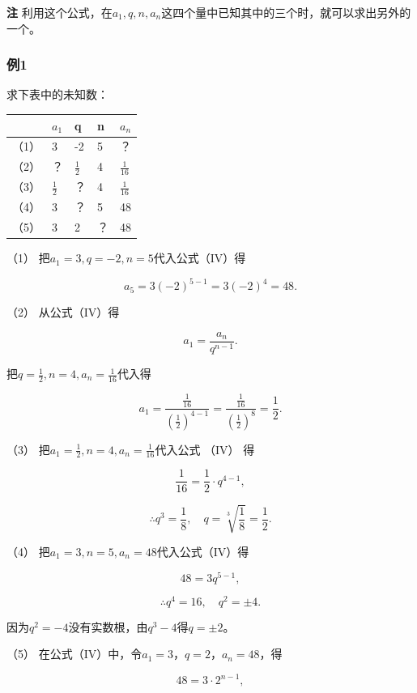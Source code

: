 \textbf{注}
利用这个公式，在\(a_1, q, n, a_n\)这四个量中已知其中的三个时，就可以求出另外的一个。

\subsubsection{例1}

求下表中的未知数：

{\def\LTcaptype{none} %
\begin{longtable}[]{@{}lllll@{}}
\toprule\noalign{}
& \(a_1\) & q & n & \(a_n\) \\
\midrule\noalign{}
\endhead
\bottomrule\noalign{}
\endlastfoot
（1） & 3 & -2 & 5 & ？ \\
（2） & ？ & \(\frac{1}{2}\) & 4 & \(\frac{1}{16}\) \\
（3） & \(\frac{1}{2}\) & ？ & 4 & \(\frac{1}{16}\) \\
（4） & 3 & ？ & 5 & 48 \\
（5） & 3 & 2 & ？ & 48 \\
\end{longtable}
}

 （1） 把\(a_1 = 3, q = -2, n = 5\)代入公式（IV）得

\[
a_{5} = 3 (- 2)^{5 - 1} = 3 (- 2)^{4} = 48.
\]

（2） 从公式（IV）得

\[
a_{1} = \frac{a_{n}}{q^{n - 1}}.
\]

把\(q = \frac{1}{2}, n = 4, a_n = \frac{1}{16}\)代入得

\[
a_{1} = \frac{\frac{1}{16}}{\left(\frac{1}{2}\right)^{4 - 1}} = \frac{\frac{1}{16}}{\left(\frac{1}{2}\right)^{8}} = \frac{1}{2}.
\]

（3） 把\(a_1 = \frac{1}{2}, n = 4, a_n = \frac{1}{16}\)代入公式 （IV）
得

\[
\frac{1}{16} = \frac{1}{2} \cdot q^{4 - 1},
\]

\[
\therefore q^{3} = \frac{1}{8}, \quad q = \sqrt[3]{\frac{1}{8}} = \frac{1}{2}.
\]

（4） 把\(a_1 = 3, n = 5, a_n = 48\)代入公式（IV）得

\[
48 = 3 q^{5 - 1},
\]

\[
\therefore q^{4} = 16, \quad q^{2} = \pm 4.
\]

因为\(q^2 = -4\)没有实数根，由\(q^3 - 4\)得\(q = \pm 2\)。

（5） 在公式（IV）中，令\(a_{1} = 3\)，\(q = 2\)，\(a_{n} = 48\)，得

\[
48 = 3 \cdot 2^{n - 1},
\]

